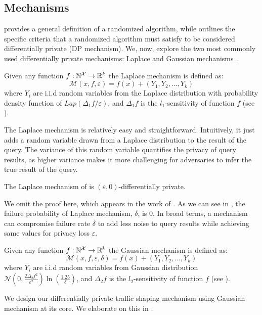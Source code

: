 \subsection{Mechanisms}\label{subsec:background-dp-mechanism}
 provides a general definition of a randomized algorithm, while  outlines the specific criteria that a randomized algorithm must satisfy to be considered differentially private (\ie DP mechanism).
We, now, explore the two most commonly used differentially private mechanisms: Laplace and Gaussian mechanisms~\cite{dwork2014algorithmic}.
\begin{definition}\label{def:laplace-mechanism}
  Given any function $f: \mathbb{N}^\mathcal{X} \rightarrow \mathbb{R}^k$ the Laplace mechanism is defined as:
  \begin{equation*}
    \mathcal{M}(x, f, \varepsilon) = f(x) + (Y_1, Y_2, \dots, Y_k)
  \end{equation*}
  where $Y_i$ are i.i.d random variables from the Laplace distribution with probability density function of $Lap(\Delta_1 f/\varepsilon)$, and $\Delta_1 f$ is the $l_1$-sensitivity of function $f$ (see ).
\end{definition}
The Laplace mechanism is relatively easy and straightforward. 
Intuitively, it just adds a random variable drawn from a Laplace distribution to the result of the query.
The variance of this random variable quantifies the privacy of query results, as higher variance makes it more challenging for adversaries to infer the true result of the query.
\begin{proposition}
  The Laplace mechanism of  is $(\varepsilon, 0)$-differentially private. 
\end{proposition}
\noindent
We omit the proof here, which appears in the work of . 
As we can see in , the failure probability of Laplace mechanism, $\delta$, is 0.
In broad terms, a mechanism can compromise failure rate $\delta$ to add less noise to query results while achieving same values for privacy loss $\varepsilon$.
\begin{definition}\label{def:gaussian-mechanism}
  Given any function $f: \mathbb{N}^\mathcal{X} \rightarrow \mathbb{R}^k$ the Gaussian mechanism is defined as:
  \begin{equation*}
    \mathcal{M}(x, f, \varepsilon, \delta) = f(x) + (Y_1, Y_2, \dots, Y_k)
  \end{equation*}
  where $Y_i$ are i.i.d random variables from Gaussian distribution $\mathcal{N}(0, \frac{2\Delta_2 f^2}{\varepsilon^2})\ln(\frac{1.25}{\delta})$, and $\Delta_2 f$ is the $l_2$-sensitivity of function $f$ (see ).
\end{definition}
We design our differentially private traffic shaping mechanism using Gaussian mechanism at its core. 
We elaborate on this in .

